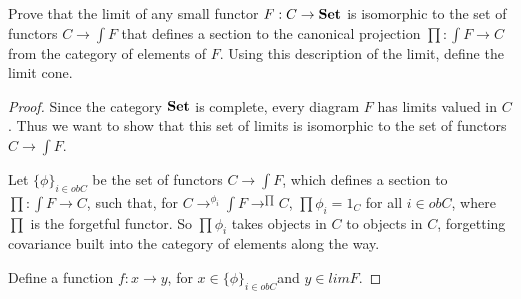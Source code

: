 \documentclass[main.tex]{subfiles}
\begin{document}
\begin{lemma}[3.2.vi]
	Prove that the limit of any small functor $F: C \rightarrow \bold{Set}$ is
	isomorphic to the set of functors $C \rightarrow \int F$ that defines a
	section to the canonical projection $ \prod : \int F \rightarrow C$ from the
	category of elements of $F$. Using this description of the limit, define the
	limit cone.
\end{lemma}

\begin{proof}
	Since the category $\bold{Set}$ is complete, every diagram $F$ has limits
	valued in $C$. Thus we want to show that this set of limits is isomorphic to
	the set of functors $C \rightarrow \int F$.

	Let $\{ \phi\} _{i \in obC}$ be the set of functors $C \rightarrow \int F$,
	which defines a section to $ \prod : \int F \rightarrow C$, such that, for
	$C\rightarrow^{\phi_i}\int F \rightarrow^{\prod} C$, $\prod \phi_i = 1_C$
	for all $i \in obC$, where $\prod$ is the forgetful functor. So $\prod
	\phi_i$ takes objects in $C$ to objects in $C$, forgetting covariance built
	into the category of elements along the way.

	Define a function $f: x \rightarrow y$, for $x \in \{ \phi\} _{i \in obC}
	$and $y \in limF$.
\end{proof}
\end{document}
